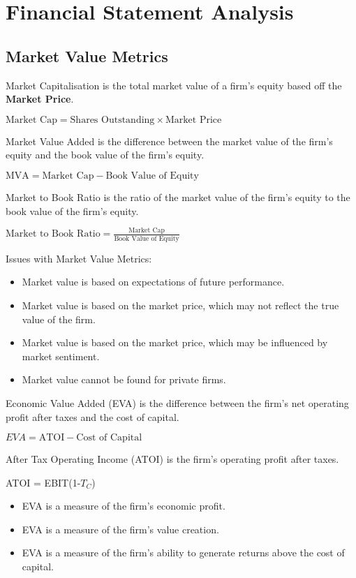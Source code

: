 \section{Financial Statement Analysis}

\subsection{Market Value Metrics}
Market Capitalisation is the total market value of a firm's equity based off the \textbf{Market Price}.

$\text{Market Cap} = \text{Shares Outstanding} \times \text{Market Price}$

Market Value Added is the difference between the market value of the firm's equity and the book value of the firm's equity.

$\text{MVA} = \text{Market Cap} - \text{Book Value of Equity}$

Market to Book Ratio is the ratio of the market value of the firm's equity to the book value of the firm's equity.

$\text{Market to Book Ratio} = \frac{\text{Market Cap}}{\text{Book Value of Equity}}$

Issues with Market Value Metrics:
\begin{itemize}
    \item Market value is based on expectations of future performance.
    \item Market value is based on the market price, which may not reflect the true value of the firm.
    \item Market value is based on the market price, which may be influenced by market sentiment.
    \item Market value cannot be found for private firms.
\end{itemize}

Economic Value Added (EVA) is the difference between the firm's net operating
profit after taxes and the cost of capital.

$EVA = \text{ATOI} - \text{Cost of Capital}$

After Tax Operating Income (ATOI) is the firm's operating profit after taxes. 

ATOI = EBIT(1-$T_C$)

\begin{itemize}
    \item EVA is a measure of the firm's economic profit.
    \item EVA is a measure of the firm's value creation.
    \item EVA is a measure of the firm's ability to generate returns above the cost of capital.
\end{itemize}

